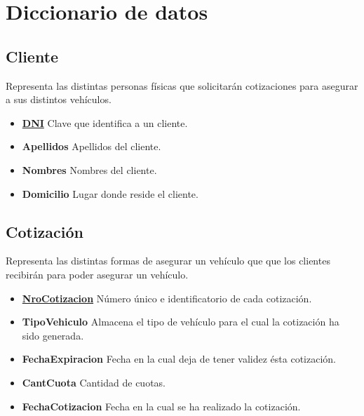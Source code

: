 \documentclass[a4paper,11pt]{article}
\begin{document}

  

\section{Diccionario de datos}

\subsection{Cliente}

Representa las distintas personas físicas que solicitarán cotizaciones para asegurar 
a sus distintos vehículos.

\begin{itemize}

  \item \textbf{\uline{DNI}} Clave que identifica a un cliente.
  
  \item \textbf{Apellidos} Apellidos del cliente.

  \item \textbf{Nombres} Nombres del cliente.
  
  \item \textbf{Domicilio} Lugar donde reside el cliente.
  
\end{itemize}

\subsection{Cotización}

Representa las distintas formas de asegurar un vehículo que  que los clientes recibirán para poder asegurar
un vehículo.

\begin{itemize}

  \item \textbf{\uline{NroCotizacion}} Número único e identificatorio de cada cotización.
  
  \item \textbf{TipoVehiculo} Almacena el tipo de vehículo para el cual la cotización ha sido generada.

  \item \textbf{FechaExpiracion} Fecha en la cual deja de tener validez ésta cotización.
  
  \item \textbf{CantCuota} Cantidad de cuotas.

  \item \textbf{FechaCotizacion} Fecha en la cual se ha realizado la cotización.
      
\end{itemize}
\end{document}
